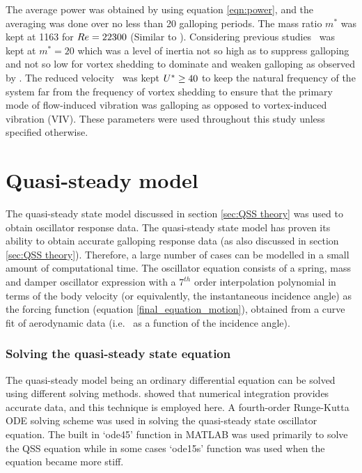 The average power was obtained by using equation \ref{eqn:power}, and the averaging was done over no less than 20 galloping periods. The mass ratio $m^*$ was kept at 1163 for $Re=22300$ (Similar to \citet{Parkinson1964}). Considering previous studies \citep{Robertson2003,Joly2012} \mstar\ was kept at $m^*=20$ which was a level of inertia not so high as to suppress galloping and not so low for vortex shedding to dominate and weaken galloping as observed by \citet{Joly2012}. The reduced velocity \ustar\ was kept $U^{*}\geq 40$ to keep the natural frequency of the system far from the frequency of vortex shedding to ensure that the primary mode of flow-induced vibration was galloping as opposed to vortex-induced vibration (VIV). These parameters were used throughout this study unless specified otherwise.

\section{Quasi-steady model}
\label{sec:QSS_model_methodology}

The quasi-steady state model discussed in section \ref{sec:QSS theory} was used to obtain oscillator response data. The quasi-steady state model has proven its ability to obtain accurate galloping response data (as also discussed in section \ref{sec:QSS theory}). Therefore, a large number of cases can be modelled in a small amount of computational time. The oscillator equation consists of a spring, mass and damper oscillator expression with a $7^{th}$ order interpolation polynomial in terms of the body velocity (or equivalently, the instantaneous incidence angle) as the forcing function (equation \ref{final_equation_motion}), obtained from a curve fit of aerodynamic data (i.e. \cy\ as a function of the incidence angle).

\subsubsection{Solving the quasi-steady state equation}

The quasi-steady model being an ordinary differential equation can be solved using different solving methods. \citet{Vio2007} showed that numerical integration provides accurate data, and this technique is employed here. A fourth-order Runge-Kutta ODE solving scheme was used in solving the quasi-steady state oscillator equation. The built in `ode45' function in MATLAB was used primarily to solve the QSS equation while in some cases `ode15s' function was used when the equation became more stiff.


